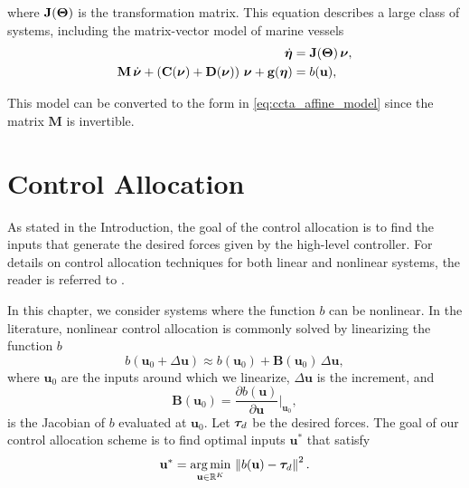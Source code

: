 \noindent where $\mathbf{J}(\bm{\Theta})$ is the transformation matrix. %
This equation describes a large class of systems, including the matrix-vector model of marine vessels \cite{fossen_handbook_2011}
\begin{subequations}
    \begin{align}
        \dot{\bs{\eta}} &= \mathbf{J}(\bs{\Theta})\,\bs{\nu}, \\
        \mathbf{M}\,\dot{\bs{\nu}} + \left(\mathbf{C}(\bs{\nu}) + \mathbf{D}(\bs{\nu})\right)\,\bs{\nu} + \mathbf{g}(\bs{\eta}) &= b(\mathbf{u}),%
    \end{align}
    \label{eq:ccta_matrix_model}
    \vspace{-4mm}
\end{subequations}

\noindent This model can be converted to the form in \eqref{eq:ccta_affine_model} since the matrix $\mathbf{M}$ is invertible.

\section{Control Allocation}
\label{sec:ccta_alloc}

As stated in the Introduction, the goal of the control allocation is to find the inputs that generate the desired forces given by the high-level controller.
For details on control allocation techniques for both linear and nonlinear systems, the reader is referred to \cite{johansen_control_2013}.

In this chapter, we consider systems where the function $b$ can be nonlinear.
In the literature, nonlinear control allocation is commonly solved by linearizing the function $b$ \cite{harkegard_dynamic_2004,johansen_constrained_2004}%
\begin{equation}
    b(\mathbf{u}_0 + \Delta\mathbf{u}) \approx b(\mathbf{u}_0) + \mathbf{B}(\mathbf{u}_0)\,\Delta\mathbf{u},
    \label{eq:ccta_forces_approximation}
\end{equation}
where $\mathbf{u}_0$ are the inputs around which we linearize, $\Delta\mathbf{u}$ is the increment, and
\begin{equation}
    \mathbf{B}(\mathbf{u}_0) = \frac{\partial b(\mathbf{u})}{\partial \mathbf{u}}\bigg|_{\mathbf{u}_0},
\end{equation}
is the Jacobian of $b$ evaluated at $\mathbf{u}_0$.
Let $\bm{\tau}_d$ be the desired forces.
The goal of our control allocation scheme is to find optimal inputs $\mathbf{u}^*$ that satisfy
\begin{equation}
    \mathbf{u}^* = \operatorname*{arg\,min}_{\mathbf{u}\in\mathbb{R}^{K}}\,\left\| b(\mathbf{u}) - \bm{\tau}_d \right\|^2.
\end{equation}

